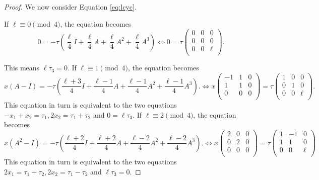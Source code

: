 \documentclass[12pt]{article}
\theoremstyle{definition}
\theoremstyle{remark}
\begin{document}
\begin{proof}

We now consider Equation \eqref{eq:lcyc}.

If $\ell \equiv 0 \pmod 4$, the equation becomes
\[
0 = -\tau \left(\frac{\ell}{4} I+ \frac{\ell}{4} A+\frac{\ell}{4} A^2+\frac{\ell}{4} A^3\right)
\Leftrightarrow
0=\tau \begin{pmatrix}
    0 & 0 & 0\\
0 & 0& 0\\
    0 & 0 &  \ell
    \\
\end{pmatrix}.
\]

This means $\ell\tau_3=0.$ If $\ell \equiv 1 \pmod 4$, the equation becomes
\[
x(A-I) = -\tau \left(\frac{\ell+3}{4} I+ \frac{\ell-1}{4} A+\frac{\ell-1}{4} A^2+\frac{\ell-1}{4} A^3\right).
\Leftrightarrow
x\begin{pmatrix}
    -1 & 1 & 0\\
1 & 1& 0\\
    0 & 0 &  0
    \\
\end{pmatrix}=\tau  \begin{pmatrix}
    1 & 0 & 0\\
0 & 1& 0\\
    0 & 0 &  \ell
    \\
\end{pmatrix}.
\]
This equation in turn is equivalent to the two equations $
-x_1 + x_2 = \tau_1, 2x_2 = \tau_1+\tau_2$ and $
0= \ell \tau_3.$
If $\ell \equiv 2 \pmod 4$, the equation becomes
\[
x(A^2-I) = -\tau \left(\frac{\ell+2}{4} I+ \frac{\ell+2}{4} A+\frac{\ell-2}{4} A^2+\frac{\ell-2}{4} A^3\right).
\Leftrightarrow
x\begin{pmatrix}
    2 & 0 & 0\\
0 & 2& 0\\
    0 & 0 &  0
    \\
\end{pmatrix}=\tau  \begin{pmatrix}
    1 & -1 & 0\\
1 & 1& 0\\
    0 & 0 &  \ell
    \\
\end{pmatrix}
\]
This equation in turn is equivalent to the two equations $2x_1 = \tau_1+\tau_2,2x_2 = \tau_1-\tau_2$ and $\ell\tau_3=0.$



\end{proof}
\end{document}
